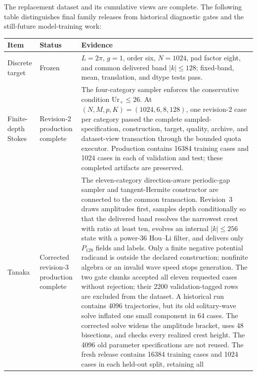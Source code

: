 \documentclass[11pt]{article}
\begin{document}
The replacement dataset and its cumulative views are complete.  The following
table distinguishes final family releases from historical diagnostic gates and
the still-future model-training work:
\begin{center}
\footnotesize
\begin{tabularx}{\textwidth}{
  @{}>{\raggedright\arraybackslash}p{}
     >{\raggedright\arraybackslash}p{}
     >{\raggedright\arraybackslash}X@{}}
  \toprule
  Item & Status & Evidence \\
  \midrule
  Discrete target
    & Frozen
    & $L=2\pi$, $g=1$, order six, $N=1024$, pad factor eight, and common
      delivered band $|k|\leq128$; fixed-band, mean, translation, and dtype
      tests pass. \\
  Finite-depth Stokes
    & Revision-2 production complete
    & The four-category sampler enforces the conservative condition
      $\mathrm{Ur}_+\leq26$.  At
      $(N,M,p,K)=(1024,6,8,128)$, one revision-2 case per category passed
      the complete sampled-specification, construction, target, quality,
      archive, and dataset-view transaction through the bounded quota
      executor.  Production contains 16384 training cases and 1024 cases in
      each of validation and test; these completed artifacts are preserved. \\
  Tanaka
    & Corrected revision-3 production complete
    & The eleven-category direction-aware periodic-gap sampler and
      tangent-Hermite constructor are
      connected to the common transaction.  Revision~3 draws amplitudes first,
      samples depth conditionally so that the delivered band resolves the
      narrowest crest with ratio at least ten, evolves an internal
      $|k|\leq256$ state with a power-36 Hou--Li filter, and delivers only
      $P_{128}$ fields and labels.  Only a finite negative potential radicand
      is outside the declared construction; nonfinite algebra or an invalid
      wave speed stops generation.  The two gate chunks accepted all eleven
      requested cases without rejection; their 2200 validation-tagged rows are
      excluded from the dataset.  A historical run contains 4096 trajectories,
      but its old solitary-wave solve inflated one small component in 64
      cases.  The corrected solve widens the amplitude bracket, uses 48
      bisections, and checks every realized crest height.  The 4096 old
      parameter specifications are not reused.  The fresh release contains
      16384 training cases and 1024 cases in each held-out split, retaining all

\end{tabularx}
\end{center}
\end{document}
